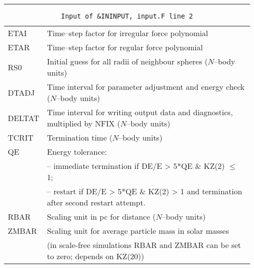 \hrule
\noindent
\begin{longtable}{@{}p{1.5cm}p{13.0cm}}
\caption{\texttt{Input of \&ININPUT, input.F line 2}}
\label{table:ininput2}\\\hline
%
ETAI    & Time--step factor for irregular force polynomial\\
ETAR    & Time--step factor for regular force polynomial\\
RS0     & Initial guess for all radii of neighbour spheres ($N$--body units)\\
DTADJ   & Time interval for parameter adjustment and energy check ($N$--body units) \\
DELTAT  & Time interval for writing output data and diagnostics,
          multiplied by NFIX ($N$--body units)\\
TCRIT   & Termination time ($N$--body units) \\
QE      & Energy tolerance:\\
        & -- immediate termination if DE/E > 5*QE \& KZ(2) $\leq$ 1;\\
        & -- restart if DE/E > 5*QE \& KZ(2) > 1 and
         termination after second restart attempt.\\
RBAR    & Scaling unit in pc for distance ($N$--body units)\\
ZMBAR   & Scaling unit for average particle mass in solar masses\\
        & (in scale-free simulations RBAR and ZMBAR can be set to zero; depends on KZ(20)) \\
\end{longtable}

